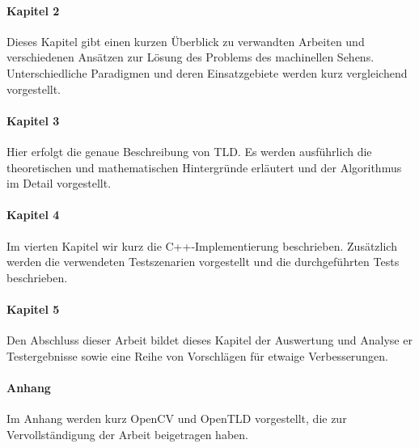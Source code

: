 \paragraph{Kapitel 2}
Dieses Kapitel gibt einen kurzen Überblick zu verwandten Arbeiten und verschiedenen Ansätzen zur Lösung des Problems des machinellen Sehens. Unterschiedliche Paradigmen und deren Einsatzgebiete werden kurz vergleichend vorgestellt.

\paragraph{Kapitel 3 }
Hier erfolgt die genaue Beschreibung von TLD. Es werden ausführlich die theoretischen und mathematischen Hintergründe erläutert und der Algorithmus im Detail vorgestellt.

\paragraph{Kapitel 4}
Im vierten Kapitel wir kurz die C++-Implementierung beschrieben. Zusätzlich werden die verwendeten Testszenarien vorgestellt und die durchgeführten Tests beschrieben.

\paragraph{Kapitel 5}
Den Abschluss dieser Arbeit bildet dieses Kapitel der Auswertung und Analyse er Testergebnisse sowie eine Reihe von Vorschlägen für etwaige Verbesserungen.

\paragraph{Anhang}
Im Anhang werden kurz OpenCV und OpenTLD vorgestellt, die zur Vervollständigung der Arbeit beigetragen haben.